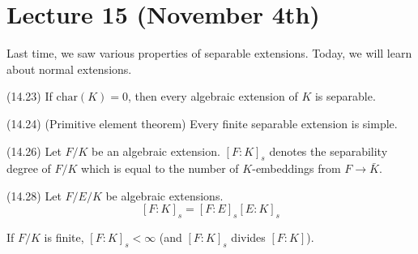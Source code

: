 \section{Lecture 15 (November 4th)}
\begin{rmk}
Last time, we saw various properties of separable extensions. Today, we will learn about normal extensions.
\end{rmk}
\vspace{2ex}
\begin{prop}
(14.23) If $\mathrm{char}(K)=0$, then every algebraic extension of $K$ is separable. 
\end{prop}
\vspace{2ex}
\begin{prop}
(14.24) (Primitive element theorem) Every finite separable extension is simple.
\end{prop}
\vspace{2ex}
\begin{defi}
(14.26) Let $F/K$ be an algebraic extension. $[F:K]_{s}$ denotes the separability degree of $F/K$ which is equal to the number of $K$-embeddings from $F\rightarrow \bar{K}$.
\end{defi}
\vspace{2ex}
\begin{prop}
(14.28) Let $F/E/K$ be algebraic extensions.
\[[F:K]_{s}=[F:E]_{s}[E:K]_{s}\]
\end{prop}
\vspace{2ex}
\begin{cor}
If $F/K$ is finite, $[F:K]_{s}<\infty $ (and $[F:K]_{s}$ divides $[F:K]$). 
\end{cor}
\vspace{2ex}
